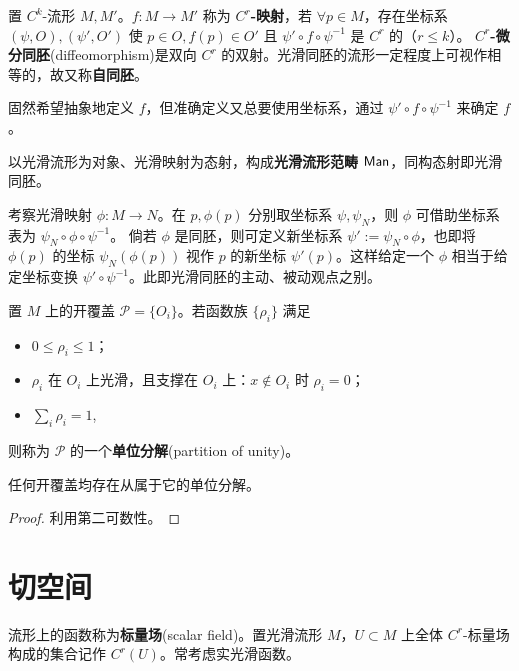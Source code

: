 \begin{definition}
    置 $C^k$-流形 $M,M'$。$f:M\to M'$ 称为 $C^r$\textbf{-映射}，若 $\forall p\in M$，存在坐标系 $(\psi,O),(\psi',O')$ 使 $p\in O,f(p)\in O'$ 且 $\psi'\circ f\circ \psi^{-1}$ 是 $C^r$ 的（$r\leqslant k$）。
    \textbf{$C^r$-微分同胚}(diffeomorphism)是双向 $C^r$ 的双射。光滑同胚的流形一定程度上可视作相等的，故又称\textbf{自同胚}。
\end{definition}
\begin{remark}
    固然希望抽象地定义 $f$，但准确定义又总要使用坐标系，通过 $\psi'\circ f\circ \psi^{-1}$ 来确定 $f$。
\end{remark}

以光滑流形为对象、光滑映射为态射，构成\textbf{光滑流形范畴} $\mathsf{Man}$，同构态射即光滑同胚。

考察光滑映射 $\phi:M\to N$。在 $p,\phi(p)$ 分别取坐标系 $\psi,\psi_N$，则 $\phi$ 可借助坐标系表为 $\psi_N \circ\phi\circ\psi^{-1}$。
倘若 $\phi$ 是同胚，则可定义新坐标系 $\psi':=\psi_N\circ\phi$，也即将 $\phi(p)$ 的坐标 $\psi_N(\phi(p))$ 视作 $p$ 的新坐标 $\psi'(p)$。这样给定一个 $\phi$ 相当于给定坐标变换 $\psi' \circ\psi^{-1}$。此即光滑同胚的主动、被动观点之别。

\begin{definition}
    置 $M$ 上的开覆盖 $\mathscr P=\{O_i\}$。若函数族 $\{\rho_i\}$ 满足
    \begin{itemize}
        \item $0\leqslant\rho_i\leqslant 1$；
        \item $\rho_i$ 在 $O_i$ 上光滑，且支撑在 $O_i$ 上：$x\notin O_i$ 时 $\rho_i=0$；
        \item $\sum_i \rho_i=1$,
    \end{itemize}
    则称为 $\mathscr P$ 的一个\textbf{单位分解}(partition of unity)。
\end{definition}
\begin{theorem}
    任何开覆盖均存在从属于它的单位分解。
\end{theorem}
\begin{proof}
    利用第二可数性。
\end{proof}

\section{切空间}

\begin{definition}
    流形上的函数称为\textbf{标量场}(scalar field)。置光滑流形 $M$，$U\subset M$ 上全体 $C^r$-标量场构成的集合记作 $C^r(U)$。常考虑实光滑函数。
\end{definition}

